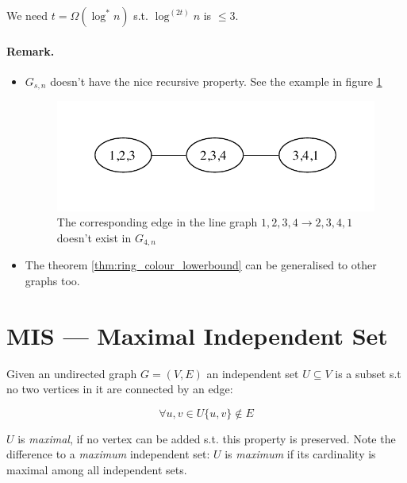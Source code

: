 \begin{pr} We need $t=\Omega(\log^* n)$ s.t. $\log^{(2t)} n$ is $\leq 3$.\end{pr}

\paragraph{Remark.}

\begin{itemize} 
\item$G_{s,n}$ doesn't have the nice recursive property. See the example in figure \ref{fig:g_3_counterex}

\begin{figure}[hbt]
\begin{center}
\includegraphics{./images/g_3_counterex}
\end{center}
\caption{The corresponding edge in the line graph $1,2,3,4 \rightarrow 2,3,4,1$ doesn't exist in $G_{4,n}$}
\label{fig:g_3_counterex}
\end{figure}

%
%
%
\item The theorem \ref{thm:ring_colour_lowerbound} can be generalised to other graphs too.
\end{itemize}

\section{MIS --- Maximal Independent Set}

\begin{Def} Given an undirected graph $G=(V,E)$ an independent set $U\subseteq V$ is a subset s.t no two vertices in it are connected by an edge:

\[\forall u,v \in U \{u,v\}\not \in E\]

$U$ is \emph{maximal}, if no vertex can be added s.t. this property is preserved. Note the difference to a \emph{maximum} independent set: $U$ is \emph{maximum} if its cardinality is maximal among all independent sets.
\end{Def}

